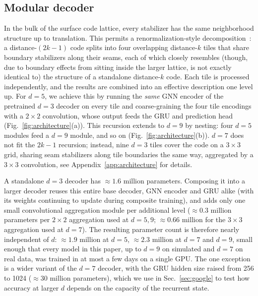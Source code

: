 \documentclass[aps,prxquantum,twocolumn,superscriptaddress,nofootinbib]{revtex4-2}
\begin{document}
\subsection{Modular decoder}
\label{sec:modular}

In the bulk of the surface code lattice, every stabilizer has the same neighborhood structure up to translation. This permits a renormalization-style decomposition~\cite{duclos2010fast}: a distance-$(2k{-}1)$ code splits into four overlapping distance-$k$ tiles that share boundary stabilizers along their seams, each of which closely resembles (though, due to boundary effects from sitting inside the larger lattice, is not exactly identical to) the structure of a standalone distance-$k$ code. Each tile is processed independently, and the results are combined into an effective description one level up. For $d=5$, we achieve this by running the \emph{same} GNN encoder of the pretrained $d=3$ decoder on every tile and coarse-graining the four tile encodings with a $2\times 2$ convolution, whose output feeds the GRU and prediction head (Fig.~\ref{fig:architecture}(a)). This recursion extends to $d = 9$ by nesting: four $d=5$ modules feed a $d=9$ module, and so on (Fig.~\ref{fig:architecture}(b)). $d=7$ does not fit the $2k{-}1$ recursion; instead, nine $d=3$ tiles cover the code on a $3\times 3$ grid, sharing seam stabilizers along tile boundaries the same way, aggregated by a $3\times 3$ convolution, see Appendix~\ref{app:architecture} for details.

A standalone $d=3$ decoder has $\approx 1.6$ million parameters. Composing it into a larger decoder reuses this entire base decoder, GNN encoder and GRU alike (with its weights continuing to update during composite training), and adds only one small convolutional aggregation module per additional level ($\approx 0.3$ million parameters per $2\times 2$ aggregation used at $d=5,9$; $\approx 0.66$ million for the $3\times 3$ aggregation used at $d=7$). The resulting parameter count is therefore nearly independent of $d$: $\approx 1.9$ million at $d=5$, $\approx 2.3$ million at $d=7$ and $d=9$, small enough that every model in this paper, up to $d=9$ on simulated and $d=7$ on real data, was trained in at most a few days on a single GPU. The one exception is a wider variant of the $d=7$ decoder, with the GRU hidden size raised from 256 to 1024 ($\approx 30$ million parameters), which we use in Sec.~\ref{sec:google} to test how accuracy at larger $d$ depends on the capacity of the recurrent state.
\end{document}
